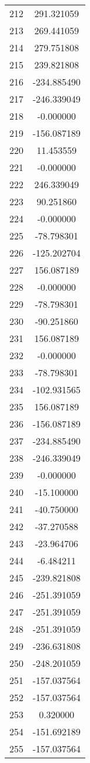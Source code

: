 \documentclass[12pt]{article}
\begin{document}
\begin{longtable}{@{}cc@{}}
212 & 291.321059 \\
213 & 269.441059 \\
214 & 279.751808 \\
215 & 239.821808 \\
216 & -234.885490 \\
217 & -246.339049 \\
218 & -0.000000 \\
219 & -156.087189 \\
220 & 11.453559 \\
221 & -0.000000 \\
222 & 246.339049 \\
223 & 90.251860 \\
224 & -0.000000 \\
225 & -78.798301 \\
226 & -125.202704 \\
227 & 156.087189 \\
228 & -0.000000 \\
229 & -78.798301 \\
230 & -90.251860 \\
231 & 156.087189 \\
232 & -0.000000 \\
233 & -78.798301 \\
234 & -102.931565 \\
235 & 156.087189 \\
236 & -156.087189 \\
237 & -234.885490 \\
238 & -246.339049 \\
239 & -0.000000 \\
240 & -15.100000 \\
241 & -40.750000 \\
242 & -37.270588 \\
243 & -23.964706 \\
244 & -6.484211 \\
245 & -239.821808 \\
246 & -251.391059 \\
247 & -251.391059 \\
248 & -251.391059 \\
249 & -236.631808 \\
250 & -248.201059 \\
251 & -157.037564 \\
252 & -157.037564 \\
253 & 0.320000 \\
254 & -151.692189 \\
255 & -157.037564 \\

\end{longtable}
\end{document}
